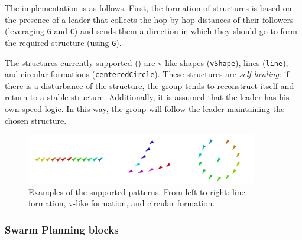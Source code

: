 The implementation is as follows. First, the formation of structures is based on the presence of a leader that
collects the hop-by-hop distances 
 of their followers (leveraging \lstinline|G| and \lstinline|C|) and
 sends them a direction in which they should go to form the required structure (using \lstinline|G|).

The structures currently supported () are v-like shapes (\lstinline|vShape|), lines (\lstinline|line|), and circular formations (\lstinline|centeredCircle|). 
 These structures are \emph{self-healing}: if there is a disturbance 
 of the structure, 
 the group tends to reconstruct itself and return to a stable structure. 
Additionally, it is assumed that the leader has his own speed logic. 
 In this way,
 the group will follow the leader maintaining the chosen structure. 
\begin{figure}[t]
  \centering
  \includegraphics[width=0.9\textwidth]{papers/coordination2023-macro/images/shapes.png}
  \caption{Examples of the supported patterns. From left to right: 
   line formation, v-like formation, and
   circular formation.
  }
   \label{coordination2023-macro:fig:formations}
\end{figure}
  
\subsubsection{Swarm Planning blocks}\label{coordination2023-macro:subsec:planner} %

